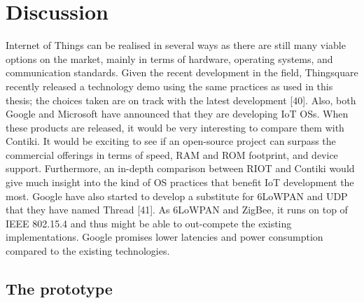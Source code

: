 \section{Discussion}

Internet of Things can be realised in several ways as there are still many viable options on the market,
	mainly in terms of hardware,
	operating systems,
	and communication standards.
Given the recent development in the field,
	Thingsquare recently released a technology demo using the same practices as used in this thesis;
	the choices taken are on track with the latest development [40].
Also,
	both Google and Microsoft have announced that they are developing IoT OSs.
When these products are released,
	it would be very interesting to compare them with Contiki.
It would be exciting to see if an open-source project can surpass the commercial offerings in terms of speed,
	RAM and ROM footprint,
	and device support.
Furthermore,
	an in-depth comparison between RIOT and Contiki would give much insight into the kind of OS practices that benefit IoT development the most.
Google have also started to develop a substitute for 6LoWPAN and UDP that they have named Thread [41].
As 6LoWPAN and ZigBee,
	it runs on top of IEEE 802.15.4 and thus might be able to out-compete the existing implementations.
Google promises lower latencies and power consumption compared to the existing technologies.

\subsection{The prototype}

